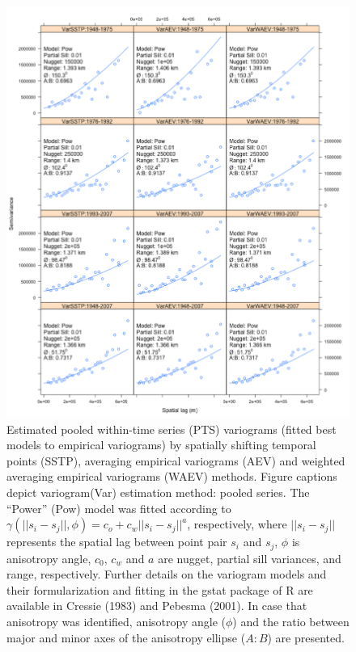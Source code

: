 \begin{figure}[h!]
  \centering
  \includegraphics[width=\textwidth]{Figures/Fig_3_6.png}
  \caption{Estimated pooled within-time series (PTS) variograms (fitted best models to empirical variograms) by spatially shifting temporal points (SSTP), averaging empirical variograms (AEV) and weighted averaging empirical variograms (WAEV) methods. Figure captions depict variogram(Var) estimation method: pooled series. The “Power” (Pow) model was fitted according to $\gamma(||s_i-s_j||,\phi)=c_o+c_w||s_i-s_j||^a$, respectively, where $||s_i-s_j||$ represents the spatial lag between point pair $s_i$ and $s_j$, $\phi$ is anisotropy angle, $c_0$, $c_w$ and $a$ are nugget, partial sill variances, and range, respectively. Further details on the variogram models and their formularization and fitting in the gstat package of R are available in Cressie (1983) and Pebesma (2001). In case that anisotropy was identified, anisotropy angle ($\phi$) and the ratio between major and minor axes of the anisotropy ellipse ($A:B$) are presented.}
  \label{Fig_3_6}
\end{figure}

